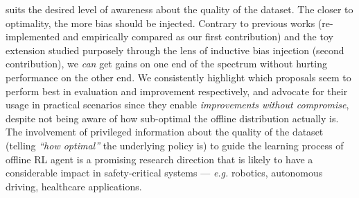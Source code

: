 suits the desired level of awareness about the quality of the dataset.
The closer to optimality, the more bias should be injected.
Contrary to previous works (re-implemented and empirically compared as our first contribution)
and the toy extension studied purposely through the lens of inductive bias injection (second contribution),
we \emph{can} get gains on one end of the spectrum without hurting performance on the other end.
We consistently highlight which proposals seem to perform best in evaluation and improvement
respectively, and advocate for their usage in practical scenarios since they enable
\emph{improvements without compromise}, despite not being aware of how sub-optimal
the offline distribution actually is.
The involvement of privileged information about the quality of the dataset
(telling \textit{``how optimal''} the underlying policy is)
to guide the learning process
of offline RL agent is a promising research direction that is likely to have a considerable impact
in safety-critical systems --- \textit{e.g.} robotics, autonomous driving, healthcare applications.
